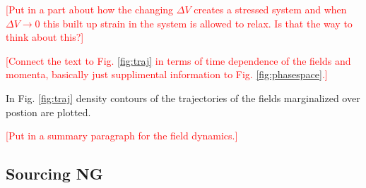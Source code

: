 \textcolor{red}{[Put in a part about how the changing $\Delta V$ creates a stressed system and when $\Delta V \to 0$ this built up strain in the system is allowed to relax. Is that the way to think about this?]}

\Fphasespace


\textcolor{red}{[Connect the text to Fig. \ref{fig:traj} in terms of time dependence of the fields and momenta, basically just supplimental information to Fig. \ref{fig:phasespace}.]}

In Fig. \ref{fig:traj} density contours of the trajectories of the fields marginalized over postion are plotted.  

\Ftraj

\textcolor{red}{[Put in a summary paragraph for the field dynamics.]}




\subsection{Sourcing NG} \label{sec:zeta production}


